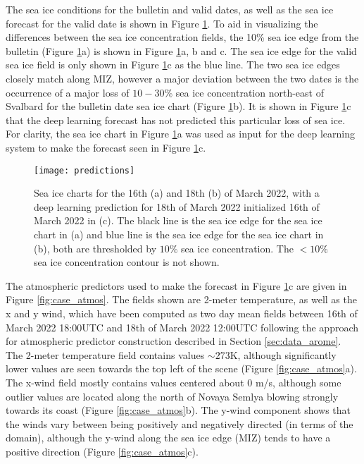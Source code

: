 \documentclass[../main/thesis.tex]{subfiles}
\begin{document}
The sea ice conditions for the bulletin and valid dates, as well as the sea ice forecast for the valid date is shown in Figure \ref{fig:case_preds}. To aid in visualizing the differences between the sea ice concentration fields, the 10\% sea ice edge from the bulletin (Figure \ref{fig:case_preds}a) is shown in Figure \ref{fig:case_preds}a, b and c. The sea ice edge for the valid sea ice field is only shown in Figure \ref{fig:case_preds}c as the blue line. The two sea ice edges closely match along MIZ, however a major deviation between the two dates is the occurrence of a major loss of $10-30\%$ sea ice concentration north-east of Svalbard for the bulletin date sea ice chart (Figure \ref{fig:case_preds}b). It is shown in Figure \ref{fig:case_preds}c that the deep learning forecast has not predicted this particular loss of sea ice. For clarity, the sea ice chart in Figure \ref{fig:case_preds}a was used as input for the deep learning system to make the forecast seen in Figure \ref{fig:case_preds}c.

\begin{figure}
    \centering
    \texttt{[image: predictions]}
    \caption{\label{fig:case_preds}Sea ice charts for the 16th (a) and 18th (b) of March 2022, with a deep learning prediction for 18th of March 2022 initialized 16th of March 2022 in (c). The black line is the sea ice edge for the sea ice chart in (a) and blue line is the sea ice edge for the sea ice chart in (b), both are thresholded by $10\%$ sea ice concentration. The $<10\%$ sea ice concentration contour is not shown.}
\end{figure}

The atmospheric predictors used to make the forecast in Figure \ref{fig:case_preds}c are given in Figure \ref{fig:case_atmos}. The fields shown are 2-meter temperature, as well as the x and y wind, which have been computed as two day mean fields between 16th of March 2022 18:00UTC and 18th of March 2022 12:00UTC following the approach for atmospheric predictor construction described in Section \ref{sec:data_arome}. The 2-meter temperature field contains values $\sim 273$K, although significantly lower values are seen towards the top left of the scene (Figure \ref{fig:case_atmos}a). The x-wind field mostly contains values centered about 0 m/s, although some outlier values are located along the north of Novaya Semlya blowing strongly towards its coast (Figure \ref{fig:case_atmos}b). The y-wind component shows that the winds vary between being positively and negatively directed (in terms of the domain), although the y-wind along the sea ice edge (MIZ) tends to have a positive direction (Figure \ref{fig:case_atmos}c).
\end{document}
